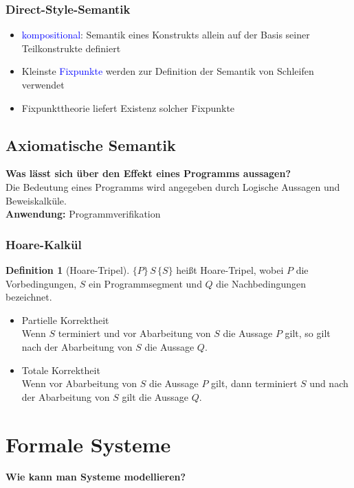 \documentclass{scrreprt}
\theoremstyle{definition}
\newtheorem{Definition}{Definition}[section]
\theoremstyle{example}
\theoremstyle{algorithm}
\begin{document}
\subsection{Direct-Style-Semantik}
\begin{itemize}
\item
\textcolor{blue}{kompositional}: Semantik eines Konstrukts allein auf der Basis seiner Teilkonstrukte definiert
\item
Kleinste \textcolor{blue}{Fixpunkte} werden zur Definition der Semantik von Schleifen verwendet
\item
Fixpunkttheorie liefert Existenz solcher Fixpunkte
\end{itemize}

\section{Axiomatische Semantik}
\textbf{\textsf{Was lässt sich über den Effekt eines Programms aussagen?}}\\
Die Bedeutung eines Programms wird angegeben durch Logische Aussagen und Beweiskalküle.\\
\textbf{Anwendung:} Programmverifikation

\subsection{Hoare-Kalkül}

\begin{Definition}[Hoare-Tripel]
$\{P\}\,S\,\{S\}$ heißt Hoare-Tripel, wobei $P$ die Vorbedingungen, $S$ ein Programmsegment und $Q$ die Nachbedingungen bezeichnet.
\begin{itemize}
\item Partielle Korrektheit\\
Wenn $S$ terminiert und vor Abarbeitung von $S$ die Aussage $P$ gilt, so gilt nach der Abarbeitung von $S$ die Aussage $Q$.
\item Totale Korrektheit\\
Wenn vor Abarbeitung von $S$ die Aussage $P$ gilt, dann terminiert $S$ und nach der Abarbeitung von $S$ gilt die Aussage $Q$.
\end{itemize}
\end{Definition}

\chapter{Formale Systeme}
{\Large\textbf{\textsf{Wie kann man Systeme modellieren?}}}
\end{document}
